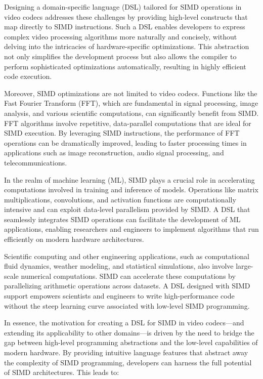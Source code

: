 \documentclass[12pt,a4paper]{article}
\begin{document}
Designing a domain-specific language (DSL) tailored for SIMD operations in video codecs addresses these challenges by providing high-level constructs that map directly to SIMD instructions. Such a DSL enables developers to express complex video processing algorithms more naturally and concisely, without delving into the intricacies of hardware-specific optimizations. This abstraction not only simplifies the development process but also allows the compiler to perform sophisticated optimizations automatically, resulting in highly efficient code execution.

Moreover, SIMD optimizations are not limited to video codecs. Functions like the Fast Fourier Transform (FFT), which are fundamental in signal processing, image analysis, and various scientific computations, can significantly benefit from SIMD. FFT algorithms involve repetitive, data-parallel computations that are ideal for SIMD execution. By leveraging SIMD instructions, the performance of FFT operations can be dramatically improved, leading to faster processing times in applications such as image reconstruction, audio signal processing, and telecommunications.

In the realm of machine learning (ML), SIMD plays a crucial role in accelerating computations involved in training and inference of models. Operations like matrix multiplications, convolutions, and activation functions are computationally intensive and can exploit data-level parallelism provided by SIMD. A DSL that seamlessly integrates SIMD operations can facilitate the development of ML applications, enabling researchers and engineers to implement algorithms that run efficiently on modern hardware architectures.

Scientific computing and other engineering applications, such as computational fluid dynamics, weather modeling, and statistical simulations, also involve large-scale numerical computations. SIMD can accelerate these computations by parallelizing arithmetic operations across datasets. A DSL designed with SIMD support empowers scientists and engineers to write high-performance code without the steep learning curve associated with low-level SIMD programming.

In essence, the motivation for creating a DSL for SIMD in video codecs—and extending its applicability to other domains—is driven by the need to bridge the gap between high-level programming abstractions and the low-level capabilities of modern hardware. By providing intuitive language features that abstract away the complexity of SIMD programming, developers can harness the full potential of SIMD architectures. This leads to:
\end{document}
